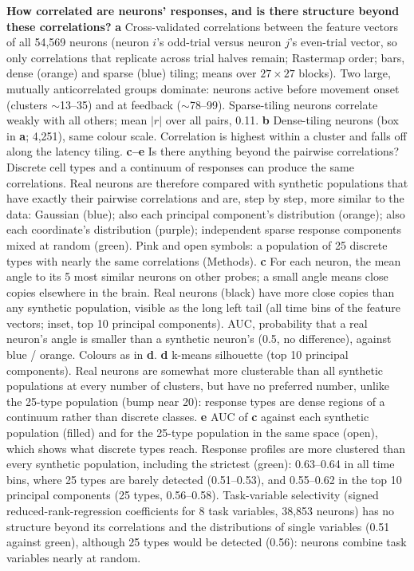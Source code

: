 \caption{\textbf{How correlated are neurons' responses, and is there structure beyond these correlations?}
\textbf{a} Cross-validated correlations between the feature vectors of all 54,569 neurons (neuron $i$'s odd-trial versus neuron $j$'s even-trial vector, so only correlations that replicate across trial halves remain; Rastermap order; bars, dense (orange) and sparse (blue) tiling; means over $27\times27$ blocks). Two large, mutually anticorrelated groups dominate: neurons active before movement onset (clusters $\sim$13--35) and at feedback ($\sim$78--99). Sparse-tiling neurons correlate weakly with all others; mean $|r|$ over all pairs, 0.11.
\textbf{b} Dense-tiling neurons (box in \textbf{a}; 4,251), same colour scale. Correlation is highest within a cluster and falls off along the latency tiling.
\textbf{c--e} Is there anything beyond the pairwise correlations? Discrete cell types and a continuum of responses can produce the same correlations. Real neurons are therefore compared with synthetic populations that have exactly their pairwise correlations and are, step by step, more similar to the data: Gaussian (blue); also each principal component's distribution (orange); also each coordinate's distribution (purple); independent sparse response components mixed at random (green). Pink and open symbols: a population of 25 discrete types with nearly the same correlations (Methods).
\textbf{c} For each neuron, the mean angle to its 5 most similar neurons on other probes; a small angle means close copies elsewhere in the brain. Real neurons (black) have more close copies than any synthetic population, visible as the long left tail (all time bins of the feature vectors; inset, top 10 principal components). AUC, probability that a real neuron's angle is smaller than a synthetic neuron's (0.5, no difference), against blue / orange. Colours as in \textbf{d}.
\textbf{d} k-means silhouette (top 10 principal components). Real neurons are somewhat more clusterable than all synthetic populations at every number of clusters, but have no preferred number, unlike the 25-type population (bump near 20): response types are dense regions of a continuum rather than discrete classes.
\textbf{e} AUC of \textbf{c} against each synthetic population (filled) and for the 25-type population in the same space (open), which shows what discrete types reach. Response profiles are more clustered than every synthetic population, including the strictest (green): 0.63--0.64 in all time bins, where 25 types are barely detected (0.51--0.53), and 0.55--0.62 in the top 10 principal components (25 types, 0.56--0.58). Task-variable selectivity (signed reduced-rank-regression coefficients for 8 task variables, 38,853 neurons) has no structure beyond its correlations and the distributions of single variables (0.51 against green), although 25 types would be detected (0.56): neurons combine task variables nearly at random.}
\label{fig:response_correlations}
